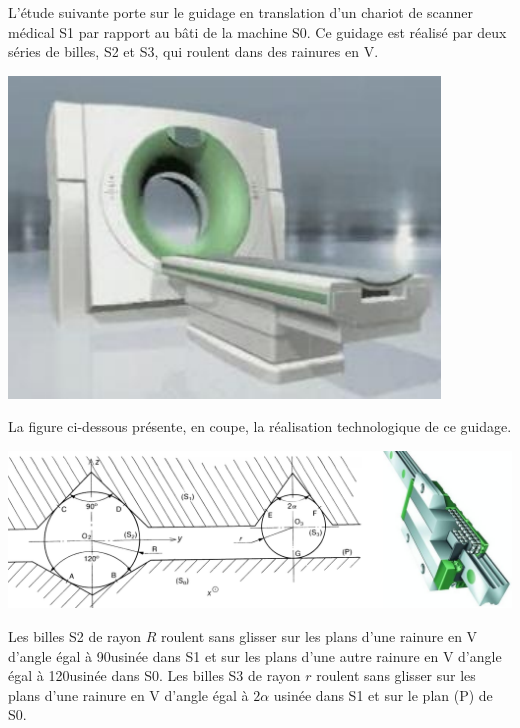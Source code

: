 \documentclass[10pt]{article}
\begin{document}
\begin{minipage}[c]{.7\linewidth}
L’étude suivante porte sur le guidage en translation d’un chariot 
de scanner médical S1 par rapport au bâti de la machine S0. Ce 
guidage est réalisé par deux séries de billes, S2 et S3, qui roulent 
dans des rainures en V. 
\end{minipage}
\begin{minipage}[c]{.25\linewidth}
\begin{center}
\includegraphics[width=.95\textwidth]{images/fig_04}
\end{center}
\end{minipage}

La figure ci-dessous présente, en coupe, la réalisation technologique de ce guidage. 

\begin{center}
\includegraphics[width=.85\textwidth]{images/fig_05}
\end{center}

Les billes S2 de rayon $R$ roulent sans glisser sur les plans d’une rainure en V d’angle égal à 90\textdegree usinée dans 
S1 et sur les plans d’une autre rainure en V d’angle égal à 120\textdegree usinée dans S0. 
Les billes S3 de rayon $r$ roulent sans glisser sur les plans d’une rainure en V d’angle égal à 
$2\alpha$ usinée dans 
S1 et sur le plan (P) de S0. 
\end{document}
